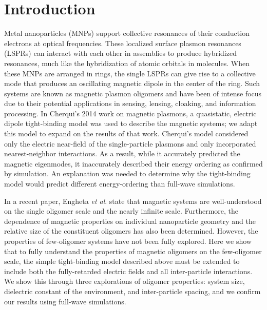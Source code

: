\documentclass[journal=apchd5,manuscript=article]{achemso}
\begin{document}
\section{Introduction}
Metal nanoparticles (MNPs) support collective resonances of their conduction electrons at optical frequencies. These localized surface plasmon resonances (LSPRs) can interact with each other in assemblies to produce hybridized resonances, much like the hybridization of atomic orbitals in molecules\cite{Lucas1976,ARAVIND1981,Xu1995,Mischenko1995}. When these MNPs are arranged in rings, the single LSPRs can give rise to a collective mode that produces an oscillating magnetic dipole in the center of the ring\cite{Alu2006,Alu2008,Liu2011,Nord2006,Cherqui2014,Cherqui2016}. Such systems are known as magnetic plasmon oligomers and have been of intense focus due to their potential applications in sensing\cite{Zia2010trans,Noginova2008trans,Wang:13,Fan2015,Wei2015,Shvets2012,Altug2012bio,Nord2011fano}, lensing\cite{Fang2005,Valentine2008}, cloaking\cite{Shalaev2008}, and information processing\cite{Zhang2006,NordHal2011,NordHal2012}. In Cherqui's 2014 work on magnetic plasmons, a quasistatic, electric dipole tight-binding model was used to describe the magnetic systems\cite{Cherqui2014}; we adapt this model to expand on the results of that work. Cherqui's model considered only the electric near-field of the single-particle plasmons and only incorporated nearest-neighbor interactions. As a result, while it accurately predicted the magnetic eigenmodes, it inaccurately described their energy ordering as confirmed by simulation. An explanation was needed to determine why the tight-binding model would predict different energy-ordering than full-wave simulations.

In a recent paper, Engheta \textit{et al}. state that magnetic systems are well-understood on the single oligomer scale and the nearly infinite scale\cite{Engheta2017}. Furthermore, the dependence of magnetic properties on individual nanoparticle geometry and the relative size of the constituent oligomers has also been determined\cite{Cherqui2016}. However, the properties of few-oligomer systems have not been fully explored. Here we show that to fully understand the properties of magnetic oligomers on the few-oligomer scale, the simple tight-binding model described above must be extended to include both the fully-retarded electric fields and all inter-particle interactions. We show this through three explorations of oligomer properties: system size, dielectric constant of the environment, and inter-particle spacing, and we confirm our results using full-wave simulations\cite{Hohenester2012}.
\end{document}
